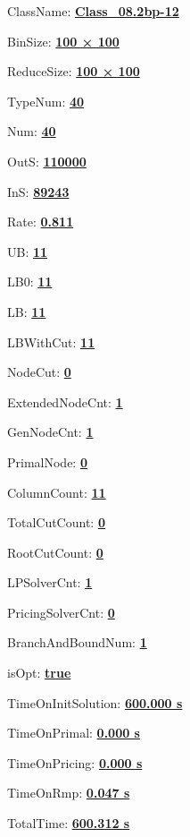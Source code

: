 \documentclass[11pt]{article}
\begin{document}
\pagestyle{empty}


ClassName: \underline{\textbf{Class_08.2bp-12}}
\par
BinSize: \underline{\textbf{100 × 100}}
\par
ReduceSize: \underline{\textbf{100 × 100}}
\par
TypeNum: \underline{\textbf{40}}
\par
Num: \underline{\textbf{40}}
\par
OutS: \underline{\textbf{110000}}
\par
InS: \underline{\textbf{89243}}
\par
Rate: \underline{\textbf{0.811}}
\par
UB: \underline{\textbf{11}}
\par
LB0: \underline{\textbf{11}}
\par
LB: \underline{\textbf{11}}
\par
LBWithCut: \underline{\textbf{11}}
\par
NodeCut: \underline{\textbf{0}}
\par
ExtendedNodeCnt: \underline{\textbf{1}}
\par
GenNodeCnt: \underline{\textbf{1}}
\par
PrimalNode: \underline{\textbf{0}}
\par
ColumnCount: \underline{\textbf{11}}
\par
TotalCutCount: \underline{\textbf{0}}
\par
RootCutCount: \underline{\textbf{0}}
\par
LPSolverCnt: \underline{\textbf{1}}
\par
PricingSolverCnt: \underline{\textbf{0}}
\par
BranchAndBoundNum: \underline{\textbf{1}}
\par
isOpt: \underline{\textbf{true}}
\par
TimeOnInitSolution: \underline{\textbf{600.000 s}}
\par
TimeOnPrimal: \underline{\textbf{0.000 s}}
\par
TimeOnPricing: \underline{\textbf{0.000 s}}
\par
TimeOnRmp: \underline{\textbf{0.047 s}}
\par
TotalTime: \underline{\textbf{600.312 s}}
\par
\newpage


\end{document}
